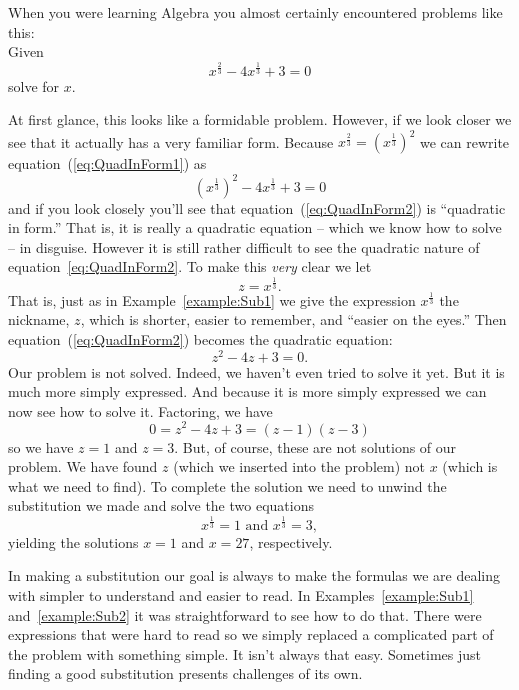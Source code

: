 \begin{myexample}
  \label{example:Sub2}
  When you were learning Algebra you almost certainly encountered
  problems like this:\\
  Given
  \begin{equation}
    x^{\frac{2}{3}}-4x^{\frac{1}{3}}+3=0\label{eq:QuadInForm1}
  \end{equation}
  solve for $x$.

  At first glance, this looks like a formidable problem.  However, if
  we look closer we see that it actually has a very familiar
  form. Because $x^{\frac{2}{3}}=\left(x^{\frac{1}{3}}\right)^2$ we
  can rewrite equation~(\ref{eq:QuadInForm1}) as
  \begin{equation}
    \left(x^{\frac{1}{3}}\right)^2-4x^{\frac{1}{3}}+3=0\label{eq:QuadInForm2}
  \end{equation}
  and if you look closely you'll see that
  equation~(\ref{eq:QuadInForm2}) is ``quadratic in form.'' That is,
  it is really a quadratic equation -- which we know how to solve --
  in disguise. However it is still rather difficult to see the
  quadratic nature of equation~\ref{eq:QuadInForm2}. To make this
  \emph{very} clear we let
  $$
  z=x^{\frac{1}{3}}.
  $$
  That is, just as in Example~\ref{example:Sub1} we give the
  expression $x^{\frac{1}{3}}$ the nickname, $z$, which is shorter, easier to
  remember, and ``easier on the eyes.'' Then
  equation~(\ref{eq:QuadInForm2}) becomes the quadratic equation:
  $$
  z^2-4z+3=0.
  $$
  Our problem is not solved. Indeed, we haven't even tried to solve it
  yet.  But it is much more simply expressed. And because it is more
  simply expressed we can now see how to solve it. 
  Factoring, we have
  $$
  0=z^2-4z+3=(z-1)(z-3)
  $$
  so we have $z=1$ and $z=3$. But, of course, these are not solutions of our
  problem. We have found $z$ (which we inserted into the problem)
  not $x$ (which is what we need to find). To complete the solution we
  need to unwind the substitution we made and solve the two equations
  $$x^{\frac{1}{3}}=1 \text{ and } x^{\frac{1}{3}}=3,$$
  yielding the solutions
    $x=1$ and $x=27$, respectively.
\end{myexample}

In making a substitution our goal is always to make the formulas we
are dealing with simpler to understand and easier to read.  In
Examples~\ref{example:Sub1} and~\ref{example:Sub2} it was
straightforward  to see how to do that.  There were expressions that were
hard to read so we simply replaced a complicated part of the problem
with something simple. It isn't always that easy.  Sometimes just
finding a good substitution presents challenges of its own.


